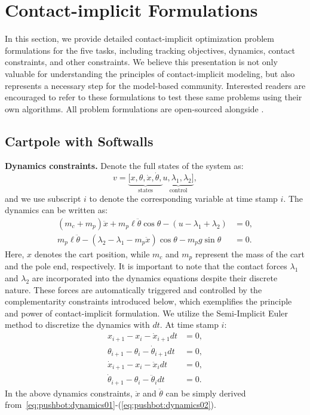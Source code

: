 \section{Contact-implicit Formulations}\label{app:contact-implicit-formulation-for-experimental-tasks}
In this section, we provide detailed contact-implicit optimization problem formulations for the five tasks, including tracking objectives, dynamics, contact constraints, and other constraints. We believe this presentation is not only valuable for understanding the principles of contact-implicit modeling, but also represents a necessary step for the model-based community. Interested readers are encouraged to refer to these formulations to test these same problems using their own algorithms. All problem formulations are open-sourced alongside \crisp.
\subsection{Cartpole with Softwalls}\label{app:formulation-cartpole}
\textbf{Dynamics constraints. } Denote the full states of the system as:
$$v = \underbrace{[x, \theta, \dot{x}, \dot{\theta},}_{\text{states}} \underbrace{u, \lambda_1, \lambda_2]}_{\text{control}},$$
and we use subscript $i$ to denote the corresponding variable at time stamp $i$. The dynamics can be written as:
\begin{align}
(m_c + m_p)\ddot{x} + m_p\ell\ddot{\theta}\cos\theta  - (u - \lambda_1 + \lambda_2) &= 0, \label{eq:pushbot:dynamics01}\\
m_p \ell \ddot{\theta} - (\lambda_2 - \lambda_1 - m_p \ddot{x}) \cos\theta - m_p g \sin\theta &= 0.\label{eq:pushbot:dynamics02}
\end{align}
Here, $x$ denotes the cart position, while $m_c$ and $m_p$ represent the mass of the cart and the pole end, respectively. It is important to note that the contact forces $\lambda_1$ and $\lambda_2$ are incorporated into the dynamics equations despite their discrete nature. These forces are automatically triggered and controlled by the complementarity constraints introduced below, which exemplifies the principle and power of contact-implicit formulation. We utilize the Semi-Implicit Euler method \cite{wiki:Semi-implicit_Euler_method} to discretize the dynamics with $dt$. At time stamp $i$:
\begin{align}
    x_{i+1} -x_{i} - \dot{x}_{i+1}dt &= 0,\\
    \theta_{i+1} -\theta_{i} - \dot{\theta}_{i+1}dt &= 0,\\
    \dot{x}_{i+1} -x_{i} - \ddot{x}_{i}dt &= 0,\\
    \dot{\theta}_{i+1} -\theta_{i} - \ddot{\theta}_{i}dt &= 0.
\end{align}
In the above dynamics constraints, $\ddot{x}$ and $\ddot{\theta}$ can be simply derived from~\eqref{eq:pushbot:dynamics01}-(\ref{eq:pushbot:dynamics02}).

